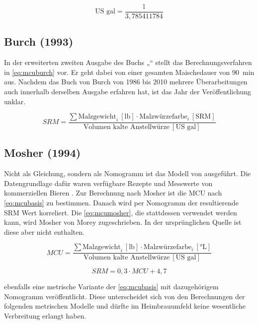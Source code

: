 \documentclass[a4paper,parskip=half]{scrartcl}
\newcommand{\MCUL}{\mathit{MCU}}
\newcommand{\SRM}{\mathit{SRM}}
\newcommand{\ulovi}{\:[\textrm{°L}]}
\newcommand{\usrm}{\:[\textrm{SRM}]}
\newcommand{\ugal}{\:[\textrm{US gal}]}
\newcommand{\ulb}{\:[\textrm{lb}]}
\begin{document}
\begin{equation}
\text{US gal} = \frac{\text{l}}{3,785411784}
\label{eq:ltogal}
\end{equation}

\subsection*{Burch (1993)}

In der erweiterten zweiten Ausgabe des Buchs „“ stellt \textcite[102]{Burch2010} das Berechnungsverfahren in \autoref{eq:mcuburch} vor. Er geht dabei von einer gesamten Maischedauer von 90~min aus. Nachdem das Buch von Burch von 1986 bis 2010 mehrere Überarbeitungen auch innerhalb derselben Ausgabe erfahren hat, ist das Jahr der Veröffentlichung unklar.

\begin{equation}
\SRM = \frac{\sum \text{Malzgewicht}_i \ulb \cdot \text{Malzwürzefarbe}_i \usrm}{\text{Volumen kalte Anstellwürze} \ugal} 
\label{eq:mcuburch}
\end{equation}

\subsection*{Mosher (1994)}

Nicht als Gleichung, sondern als Nomogramm ist das Modell von \textcite[34]{Mosher1994} ausgeführt. Die Datengrundlage dafür waren verfügbare Rezepte und Messwerte von kommerziellen Bieren \parencite{Morey2004}. Zur Berechnung nach Mosher ist die MCU nach \autoref{eq:mcubasis} zu bestimmen. Danach wird per Nomogramm der resultierende SRM Wert korreliert. Die \autoref{eq:mcumosher}, die stattdessen verwendet werden kann, wird Mosher von Morey zugeschrieben. In der ursprünglichen Quelle ist diese aber nicht enthalten. 

\begin{equation}
\MCUL = \frac{\sum \text{Malzgewicht}_i \ulb \cdot \text{Malzwürzefarbe}_i \ulovi}{\text{Volumen kalte Anstellwürze} \ugal} 
\label{eq:mcubasis}
\end{equation}

\begin{equation}
\SRM = 0,3 \cdot \MCUL + 4,7
\label{eq:mcumosher}
\end{equation}

\textcite[258]{Mosher2015} ebenfalls eine metrische Variante der \autoref{eq:mcubasis} mit dazugehörigem Nomogramm veröffentlicht. Diese unterscheidet sich von den Berechnungen der folgenden metrischen Modelle und dürfte im Heimbrauumfeld keine wesentliche Verbreitung erlangt haben.
\end{document}
